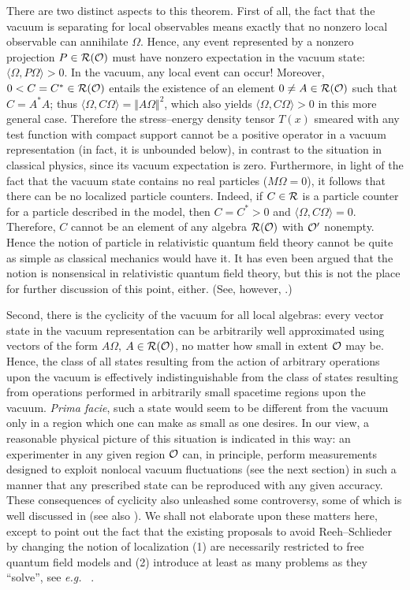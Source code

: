 \documentclass[12pt]{article}
\newcommand{\eg}{{\it e.g.\ }}
\def\Os{{\cal O}}
\def\Rs{{\cal R}}
\begin{document}
    There are two distinct aspects to this theorem. First of all, the
fact that the vacuum is separating for local observables means exactly
that no nonzero local observable can annihilate $\Omega$. Hence,
any event represented by a nonzero projection $P \in \Rs(\Os)$
must have nonzero expectation in the vacuum state: 
$\langle \Omega, P \Omega \rangle > 0$. In the vacuum, any local 
event can occur! Moreover, $0 < C = C^* \in \Rs(\Os)$ entails the 
existence of an element $0 \neq A \in \Rs(\Os)$ such that $C = A^*A$; thus 
$\langle \Omega, C \Omega \rangle = \Vert A \Omega \Vert^2$, 
which also yields $\langle \Omega, C \Omega \rangle > 0$ in this more
general case. Therefore the stress--energy density tensor $T(x)$
smeared with any test function with compact support cannot be a
positive operator in a vacuum representation \cite{EpGlJa} (in fact,
it is unbounded below), in contrast to the situation in classical
physics, since its vacuum expectation is zero. Furthermore, in light of 
the fact that the vacuum state 
contains no real particles ($M \Omega = 0$), it follows that there can be no
localized particle counters. Indeed, if $C \in \Rs$ is a particle counter 
for a particle described in the model, then $C = C^* > 0$ and 
$\langle \Omega, C \Omega \rangle = 0$. Therefore, $C$ cannot be an 
element of any algebra $\Rs(\Os)$ with $\Os'$ nonempty. 
Hence the notion of particle in relativistic quantum field theory cannot 
be quite as simple as classical mechanics would have it. It has even 
been argued that the notion is nonsensical in relativistic quantum field 
theory, but this is not the place for further discussion of this point,
either. (See, however, \cite{Haag,HaCl2,Sch0,BPS,Bu,Fr}.)

     Second, there is the cyclicity of the vacuum for all local
algebras: every vector state in the vacuum representation can be
arbitrarily well approximated using vectors of the form $A \Omega$, $A
\in \Rs(\Os)$, no matter how small in extent $\Os$ may be.  Hence, the
class of all states resulting from the action of arbitrary operations
upon the vacuum is effectively indistinguishable from the class of
states resulting from operations performed in arbitrarily small
spacetime regions upon the vacuum. {\it Prima facie}, such a state
would seem to be different from the vacuum only in a region which one
can make as small as one desires. In our view, a reasonable physical
picture of this situation is indicated in this way: an experimenter
in any given region $\Os$ can, in principle, perform measurements
designed to exploit nonlocal vacuum fluctuations (see the next
section) in such a manner that any prescribed state can be reproduced
with any given accuracy.  These consequences of cyclicity also
unleashed some controversy, some of which is well discussed in
\cite{Ha} (see also \cite{Red}). We shall not elaborate upon these
matters here, except to point out the fact that the existing proposals
to avoid Reeh--Schlieder by changing the notion of localization (1)
are necessarily restricted to free quantum field models and (2)
introduce at least as many problems as they ``solve'', see \eg
\cite{Ha}.
\end{document}
